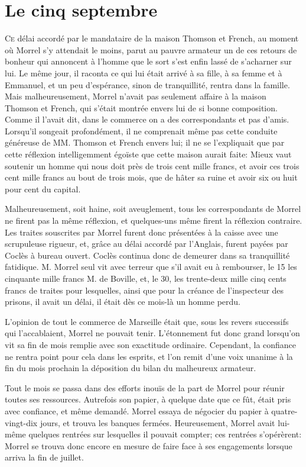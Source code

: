 \chapter{Le cinq septembre}

\lettrine{C}{e} délai accordé par le mandataire de la maison Thomson et French, au moment où Morrel s'y attendait le moins, parut au pauvre armateur un de ces retours de bonheur qui annoncent à l'homme que le sort s'est enfin lassé de s'acharner sur lui. Le même jour, il raconta ce qui lui était arrivé à sa fille, à sa femme et à Emmanuel, et un peu d'espérance, sinon de tranquillité, rentra dans la famille. Mais malheureusement, Morrel n'avait pas seulement affaire à la maison Thomson et French, qui s'était montrée envers lui de si bonne composition. Comme il l'avait dit, dans le commerce on a des correspondants et pas d'amis. Lorsqu'il songeait profondément, il ne comprenait même pas cette conduite généreuse de MM. Thomson et French envers lui; il ne se l'expliquait que par cette réflexion intelligemment égoïste que cette maison aurait faite: Mieux vaut soutenir un homme qui nous doit près de trois cent mille francs, et avoir ces trois cent mille francs au bout de trois mois, que de hâter sa ruine et avoir six ou huit pour cent du capital.

Malheureusement, soit haine, soit aveuglement, tous les correspondants de Morrel ne firent pas la même réflexion, et quelques-uns même firent la réflexion contraire. Les traites souscrites par Morrel furent donc présentées à la caisse avec une scrupuleuse rigueur, et, grâce au délai accordé par l'Anglais, furent payées par Coclès à bureau ouvert. Coclès continua donc de demeurer dans sa tranquillité fatidique. M. Morrel seul vit avec terreur que s'il avait eu à rembourser, le 15 les cinquante mille francs M. de Boville, et, le 30, les trente-deux mille cinq cents francs de traites pour lesquelles, ainsi que pour la créance de l'inspecteur des prisons, il avait un délai, il était dès ce mois-là un homme perdu.

L'opinion de tout le commerce de Marseille était que, sous les revers successifs qui l'accablaient, Morrel ne pouvait tenir. L'étonnement fut donc grand lorsqu'on vit sa fin de mois remplie avec son exactitude ordinaire. Cependant, la confiance ne rentra point pour cela dans les esprits, et l'on remit d'une voix unanime à la fin du mois prochain la déposition du bilan du malheureux armateur.

Tout le mois se passa dans des efforts inouïs de la part de Morrel pour réunir toutes ses ressources. Autrefois son papier, à quelque date que ce fût, était pris avec confiance, et même demandé. Morrel essaya de négocier du papier à quatre-vingt-dix jours, et trouva les banques fermées. Heureusement, Morrel avait lui-même quelques rentrées sur lesquelles il pouvait compter; ces rentrées s'opérèrent: Morrel se trouva donc encore en mesure de faire face à ses engagements lorsque arriva la fin de juillet.

